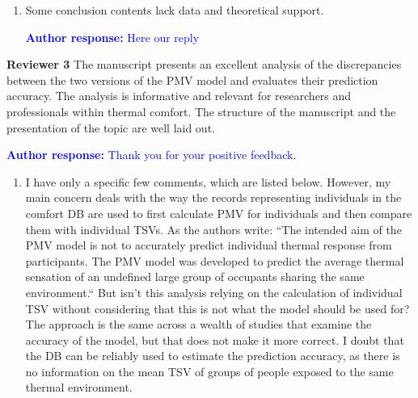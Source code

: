 \documentclass[a4paper, 10pt]{letter}
\newcommand{\response}[1]{\textcolor{blue}{\textbf{Author response:} #1}}
\begin{document}
\begin{letter}
\begin{enumerate}
            \item Some conclusion contents lack data and theoretical support.

            \response{Here our reply}

        \end{enumerate}

        \clearpage

        \textbf{Reviewer 3}
        The manuscript presents an excellent analysis of the discrepancies between the two versions of the PMV model and evaluates their prediction accuracy.
        The analysis is informative and relevant for researchers and professionals within thermal comfort.
        The structure of the manuscript and the presentation of the topic are well laid out.

        \response{
            Thank you for your positive feedback.
        }

        \begin{enumerate}
            \item I have only a specific few comments, which are listed below.
            However, my main concern deals with the way the records representing individuals in the comfort DB are used to first calculate PMV for individuals and then compare them with individual TSVs.
            As the authors write: ``The intended aim of the PMV model is not to accurately predict individual thermal response from participants.
            The PMV model was developed to predict the average thermal sensation of an undefined large group of occupants sharing the same environment.``
            But isn't this analysis relying on the calculation of individual TSV without considering that this is not what the model should be used for?
            The approach is the same across a wealth of studies that examine the accuracy of the model, but that does not make it more correct.
            I doubt that the DB can be reliably used to estimate the prediction accuracy, as there is no information on the mean TSV of groups of people exposed to the same thermal environment.


\end{enumerate}
\end{letter}
\end{document}
